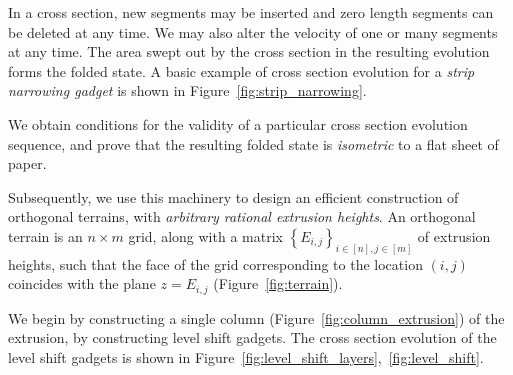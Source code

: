 In a cross section, new segments may be inserted and zero length segments can be deleted at any time.
We may also alter the velocity of one or many segments at any time.
The area swept out by the cross section in the resulting evolution forms the folded state.
A basic example of cross section evolution for a \emph{strip narrowing gadget} is shown in Figure~\ref{fig:strip_narrowing}.

\begin{figure}
    \vspace{-3.0em}
    \vspace{-0.7em}
    \graphicspath{{../figures/}}
    \def\svgwidth{0.3\textwidth}
    \vspace{-5.8em}
\end{figure}
We obtain conditions for the validity of a particular cross section evolution sequence,
and prove that the resulting folded state is \emph{isometric} to a flat sheet of paper.

Subsequently, we use this machinery to design an efficient construction of orthogonal terrains, with \emph{arbitrary rational extrusion heights}.
An orthogonal terrain is an $n\times m$ grid, along with a matrix $\left\{ E_{i,j}\right\}_{i\in [n], j\in[m]}$ of extrusion heights,
such that the face of the grid corresponding to the location $(i,j)$ coincides with the plane $z = E_{i,j}$ (Figure~\ref{fig:terrain}).

We begin by constructing a single column (Figure~\ref{fig:column_extrusion}) of the extrusion, by constructing level shift gadgets.
The cross section evolution of the level shift gadgets is shown in Figure~\ref{fig:level_shift_layers},~\ref{fig:level_shift}.

